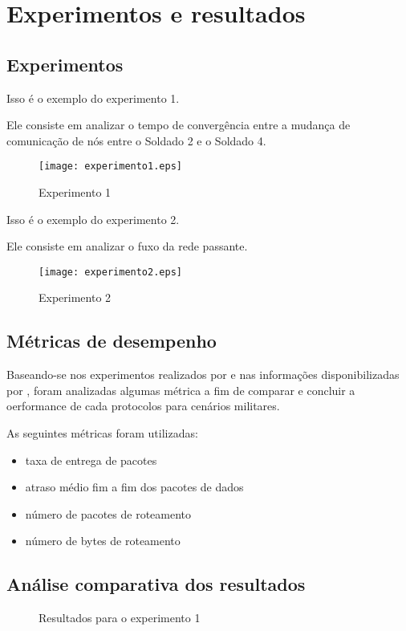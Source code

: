 \section{Experimentos e resultados}


\subsection{Experimentos}
Isso \'e o exemplo do experimento 1.

Ele consiste em analizar o tempo de converg\^encia entre a mudan\c{c}a de comunica\c{c}\~ao de n\'os entre o Soldado 2 e o Soldado 4.

\begin{figure}[H]
	\centering
	\texttt{[image: experimento1.eps]}
	\caption{Experimento 1}
	\label{figExp1}
\end{figure}

Isso \'e o exemplo do experimento 2.

Ele consiste em analizar o fuxo da rede passante.

\begin{figure}[H]
	\centering
	\texttt{[image: experimento2.eps]}
	\caption{Experimento 2}
	\label{figExp2}
\end{figure}


\subsection{M\'etricas de desempenho}
Baseando-se nos experimentos realizados por \cite{pereira} e nas informa\c{c}\~oes disponibilizadas por \cite{salles}, foram analizadas algumas m\'etrica a fim de comparar e concluir a oerformance de cada protocolos para cen\'arios militares.

As seguintes m\'etricas foram utilizadas:
\begin{itemize}
	\item taxa de entrega de pacotes
	\item atraso m\'edio fim a fim dos pacotes de dados
	\item n\'umero de pacotes de roteamento
	\item n\'umero de bytes de roteamento
\end{itemize}


\subsection{An\'alise comparativa dos resultados}

\begin{figure}[H]
	\centering
	\label{subfig:aodvLost}
	\label{subfig:aodvLate}
	
	\caption{Resultados para o experimento 1}
	\label{fig:resulExp1}
\end{figure}

